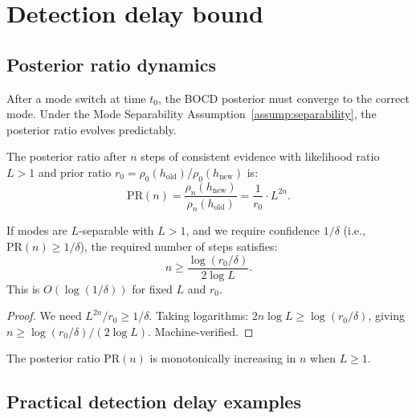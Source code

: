 \section{Detection delay bound}
\label{app:detection_delay}

\subsection{Posterior ratio dynamics}

After a mode switch at time $t_0$, the BOCD posterior must converge to the correct mode. Under the Mode Separability Assumption~\ref{assump:separability}, the posterior ratio evolves predictably.

\begin{definition}
    The posterior ratio after $n$ steps of consistent evidence with likelihood ratio $L > 1$ and prior ratio $r_0 = \rho_0(h_{\text{old}}) / \rho_0(h_{\text{new}})$ is:
    \begin{equation}
        \text{PR}(n) = \frac{\rho_n(h_{\text{new}})}{\rho_n(h_{\text{old}})} = \frac{1}{r_0} \cdot L^{2n}.
    \end{equation}
\end{definition}

\begin{theorem}
    \label{thm:delay}
    If modes are $L$-separable with $L > 1$, and we require confidence $1/\delta$ (i.e., $\text{PR}(n) \geq 1/\delta$), the required number of steps satisfies:
    \begin{equation}
        n \geq \frac{\log(r_0/\delta)}{2\log L}.
    \end{equation}
    This is $O(\log(1/\delta))$ for fixed $L$ and $r_0$.
\end{theorem}
\begin{proof}
We need $L^{2n}/r_0 \geq 1/\delta$. Taking logarithms: $2n\log L \geq \log(r_0/\delta)$, giving $n \geq \log(r_0/\delta)/(2\log L)$. Machine-verified.
\end{proof}

\begin{theorem}
    \label{thm:confidence_mono}
    The posterior ratio $\text{PR}(n)$ is monotonically increasing in $n$ when $L \geq 1$.
\end{theorem}

\subsection{Practical detection delay examples}

